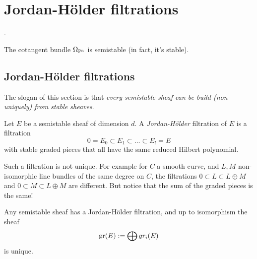 \newcommand{\holder}{Hölder\xspace}
\chapter{Jordan-\holder filtrations}
.
\newline
{}

\begin{example}
	The cotangent bundle $\Omega_{\mathbb{P}^n}$ is semistable (in fact, it's stable).
\end{example}

\section{Jordan-\holder filtrations}
The slogan of this section is that \emph{every semistable sheaf can be build (non-uniquely) from stable sheaves}.

\begin{definition}
	Let $E$ be a semistable sheaf of dimension $d$. A \emph{Jordan-\holder} filtration of $E$ is a filtration \[
    	0 = E_0 \subset E_1 \subset \dots \subset E_l = E
    \] with stable graded pieces that all have the same reduced Hilbert polynomial.
\end{definition}
\begin{rmk}
	Such a filtration is not unique. For example for $C$ a smooth curve, and $L,M$ non-isomorphic line bundles of the same degree on $C$, the filtrations $0 \subset L \subset L \oplus M$ and $0 \subset M \subset L \oplus M$ are different. But notice that the sum of the graded pieces is the same!
\end{rmk}

\begin{theorem}
	Any semistable sheaf has a Jordan-\holder filtration, and up to isomorphism the sheaf \[
    	\operatorname{gr}(E) := \bigoplus gr_i(E)
    \] is unique.
\end{theorem}
